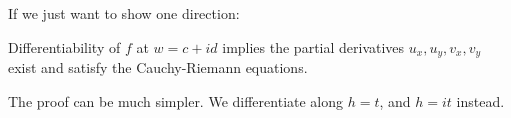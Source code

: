 \begin{remark}
    If we just want to show one direction:

    Differentiability of \(f\) at \(w = c + id\) implies the partial derivatives \(u_x, u_y, v_x, v_y\) exist and satisfy the Cauchy-Riemann equations.
    
    The proof can be much simpler. We differentiate along \(h = t\), and \(h = it\) instead.
\end{remark}